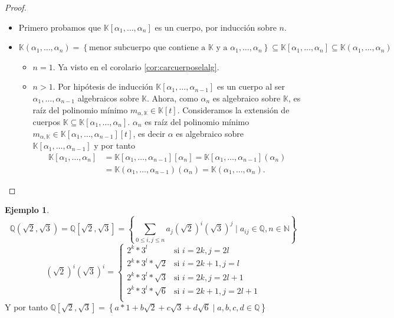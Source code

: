 \documentclass[10pt, spanish]{report}
\theoremstyle{definition}
\newtheorem*{ej}{Ejemplo}
\theoremstyle{custom}
\theoremstyle{remark}
\newcommand{\N}{\mathbb{N}}
\newcommand{\Q}{\mathbb{Q}}
\newcommand{\K}{\mathbb{K}}
\renewcommand{\leq}{\leqslant}
\begin{document}
\begin{proof}\hspace{0pt}
    \begin{itemize}
        \item Primero probamos que $\K[\alpha_1,\ldots,\alpha_n]$ es un cuerpo, por
    inducción sobre $n$.
    \item $\K(\alpha_1,\ldots,\alpha_n)=\left\{\text{menor subcuerpo que contiene a } \K \text{ y a } \alpha_1,\ldots,\alpha_n\right\}\subseteq\K[\alpha_1,\ldots,\alpha_n]\subseteq
    \K(\alpha_1,\ldots,\alpha_n)$
    \begin{itemize}
        \item $n=1$. Ya visto en el corolario \ref{cor:carcuerposelalg}.
        \item $n>1$. Por hipótesis de inducción
            $\K[\alpha_1,\ldots,\alpha_{n-1}]$ es un cuerpo al ser
            $\alpha_1,\ldots,\alpha_{n-1}$ algebraicos sobre $\K$. Ahora, como
            $\alpha_n$ es algebraico sobre $\K$, es raíz del polinomio mínimo
            $m_{\alpha,\K}\in \K[t]$. Consideramos la extensión de cuerpos
            $\K\subseteq\K[\alpha_1,\ldots,\alpha_n]$. $\alpha_n$ es raíz del
            polinomio mínimo $m_{\alpha,\K}\in
            \K[\alpha_1,\ldots,\alpha_{n-1}][t]$, es decir $\alpha$ es
            algebraico sobre $\K[\alpha_1,\ldots,\alpha_{n-1}]$ y por tanto
            \begin{align*}
                \K[\alpha_1,\ldots,\alpha_{n}]
                &=\K[\alpha_1,\ldots,\alpha_{n-1}][\alpha_n]
                =\K[\alpha_1,\ldots,\alpha_{n-1}](\alpha_n)\\
                &=\K(\alpha_1,\ldots,\alpha_{n-1})(\alpha_n)
                =\K(\alpha_1,\ldots,\alpha_n).
            \end{align*}
    \end{itemize}\vspace{-1em}
    \end{itemize}\vspace{-1.75em}
\end{proof}

\begin{ej}
    \[\Q(\sqrt{2},\sqrt{3})=\Q[\sqrt{2},\sqrt{3}]=\left\{ \sum_{0\leq
    i,j\leq n} a_j(\sqrt{2})^i(\sqrt{3})^j\mid a_{ij}\in\Q,n\in\N\right\}\]
    \[(\sqrt{2})^i(\sqrt{3})^i=\begin{cases}
        2^k*3^l &\text{si } i=2k, j=2l\\
        2^k*3^l*\sqrt{2}&\text{si } i=2k+1,j=l\\
        2^k*3^l*\sqrt{3}&\text{si } i=2k,j=2l+1\\
        2^k*3^l*\sqrt{6}&\text{si } i=2k+1,j=2l+1\\
    \end{cases}\]
    Y por tanto $\Q[\sqrt{2},\sqrt{3}]=\left\{
    a*1+b\sqrt{2}+c\sqrt{3}+d\sqrt{6}\mid a,b,c,d\in \Q    \right\} $
\end{ej}
\end{document}
